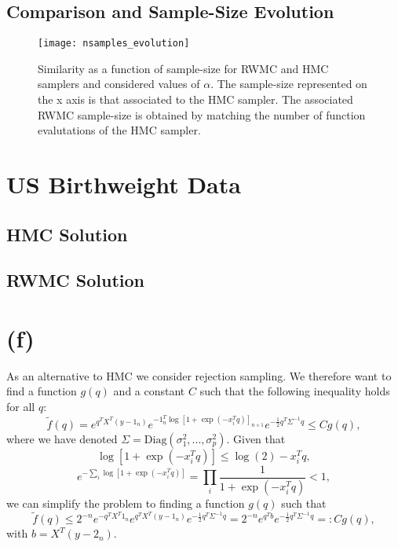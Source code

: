 \documentclass[a4paper, 12pt,oneside]{article}
\begin{document}
		\subsection{Comparison and Sample-Size Evolution}
		\begin{figure}[htb]
			\centering
				\vspace{0em}
				\texttt{[image: nsamples\_evolution]}
				\caption{Similarity as a function of sample-size for RWMC and HMC samplers and considered values of $\alpha$. The sample-size represented on the x axis is that associated to the HMC sampler. The associated RWMC sample-size is obtained by matching the number of function evalutations of the HMC sampler.}
				\label{fig:nsamples-evolution}
		\end{figure}
		\lipsum[1]
	\section{US Birthweight Data}
		\subsection{HMC Solution}
		\subsection{RWMC Solution}
	\section{(f)}
	As an alternative to HMC we consider rejection sampling. We therefore want to find a function $g(q)$ and a constant $C$ such that the following inequality holds for all $q$:
	\begin{equation}
		\tilde{f}(q) = e^{q^TX^T(y-1_{n})}e^{-1_{n}^T \log[1+\exp(-x_i^Tq)]_{n\times 1}}e^{-\frac{1}{2}q^T\Sigma^{-1} q} \leq Cg(q),
	\end{equation}
	where we have denoted $\Sigma=\text{Diag}(\sigma_1^2,...,\sigma_p^2)$.
	Given that 
	\begin{equation}
		\log[1+\exp(-x_i^Tq)] \le \log(2) - x_i^Tq,
	\end{equation}
	\begin{equation}
		e^{-\sum_i \log[1+\exp(-x_i^Tq)]} = \prod_i \frac{1}{1+\exp(-x_i^Tq)}<1,
	\end{equation}
	we can simplify the problem to finding a function $g(q)$ such that
	\begin{equation}
		\tilde{f}(q) \le 2^{-n}e^{-q^TX^T 1_n} e^{q^TX^T(y-1_{n})}e^{-\frac{1}{2}q^T\Sigma^{-1} q} = 2^{-n}e^{q^Tb}e^{-\frac{1}{2}q^T\Sigma^{-1} q}
		=: Cg(q),
	\end{equation}
	with $b=X^T(y-2_{n})$. 
\end{document}
